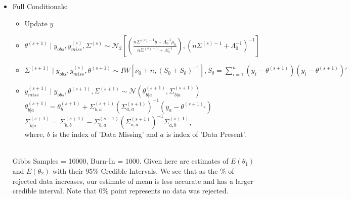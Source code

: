 \documentclass{article}
\begin{document}
\begin{itemize}
\item Full Conditionals:
\begin{itemize}
\item Update $\bar{y}$
\item $\theta^{(s+1)} \mid y_{obs},y_{miss}^{(s)},\Sigma^{(s)} \sim \mathcal{N}_2\left[\left(\frac{n\Sigma^{(s)-1}\bar{y}+\Lambda_0^{-1}\mu_0}{n\Sigma^{(s)-1}+\Lambda_0^{-1}}\right),\left(n\Sigma^{(s)-1}+\Lambda_0^{-1}\right)^{-1}\right]$
\item $\Sigma^{(s+1)} \mid y_{obs},y_{miss}^{(s)},\theta^{(s+1)} \sim IW\left[\nu_0+n,\left(S_0+S_{\theta}\right)^{-1}\right],S_{\theta} = \sum_{i=1}^{n}(y_i-\theta^{(s+1)})(y_i-\theta^{(s+1)})'$\\
\item $y_{miss}^{(s+1)} \mid y_{obs},\theta^{(s+1)},\Sigma^{(s+1)} \sim \mathcal{N}\left(\theta_{b|a}^{(s+1)},\Sigma_{b|a}^{(s+1)}\right)$\\
$\theta_{b|a}^{(s+1)} = \theta_{b}^{(s+1)} + \Sigma_{b,a}^{(s+1)}\left(\Sigma_{a,a}^{(s+1)}\right)^{-1}\left(y_{a}-\theta^{(s+1)_{a}}\right)$\\
$\Sigma_{b|a}^{(s+1)} = \Sigma_{b,b}^{(s+1)} - \Sigma_{b,a}^{(s+1)}\left(\Sigma_{a,a}^{(s+1)}\right)^{-1}\Sigma_{a,b}^{(s+1)}$, \\
where, $b$ is the index of 'Data Missing' and $a$ is index of 'Data Present'.\\
\end{itemize}

 \\

Gibbs Samples = 10000, Burn-In = 1000. Given here are estimates of $E(\theta_1)$ and $E(\theta_2)$ with their 95\% Credible Intervals. We see that as the \% of rejected data increases, our estimate of mean is less accurate and has a larger credible interval. Note that $0\%$ point represents no data was rejected.\\


\end{itemize}
\end{document}
